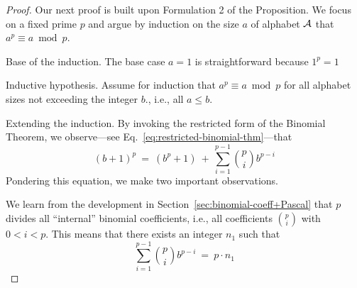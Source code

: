\begin{proof}
Our next proof is built upon Formulation 2 of the Proposition.  We focus on a fixed prime $p$ and argue by induction on the size $a$ of alphabet $\mbox{$\cal A$}$ that $a^{p} \equiv a \bmod p$.

\medskip

\noindent
{\sf Base of the induction.}
The base case $a=1$ is straightforward because $1^{p} = 1$

\medskip

\noindent
{\sf Inductive hypothesis.}
Assume for induction that $a^{p} \equiv a \bmod p$ for all alphabet sizes not exceeding the integer $b$., i.e., all $a \leq b$.

\medskip

\noindent
{\sf Extending the induction.}
By invoking the restricted form of the Binomial Theorem, we observe---see Eq.~\ref{eq:restricted-binomial-thm}---that
\begin{equation}
\label{eq:FLT-0}
(b+1)^p \ = \ \left( b^p + 1 \right) \ + \ \sum_{i=1}^{p-1} {p \choose i} b^{p-i}
\end{equation}
Pondering this equation, we make two important observations.

\medskip

We learn from the development in Section~\ref{sec:binomial-coeff+Pascal} that $p$ divides all
``internal'' binomial coefficients, i.e., all coefficients $\displaystyle {p \choose i}$ with $0 < i < p$.  This means that there exists an integer $n_1$ such that
\begin{equation}
\label{eq:FLT-1}
 \sum_{i=1}^{p-1} {p \choose i} b^{p-i} \ = \ p \cdot n_1
\end{equation}

\bigskip

\noindent {}

\bigskip


\end{proof}
